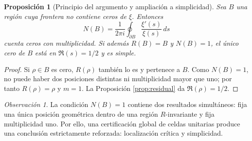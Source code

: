 \documentclass[11pt]{amsart}
\newtheorem{proposition}[theorem]{Proposición}
\theoremstyle{definition}
\theoremstyle{remark}
\newtheorem{remark}[theorem]{Observación}
\begin{document}
\begin{proposition}[Principio del argumento y ampliación a simplicidad]
Sea $B$ una región cuya frontera no contiene ceros de $\xi$. Entonces
\begin{equation}
 N(B)=\frac{1}{2\pi i}\oint_{\partial B}\frac{\xi'(s)}{\xi(s)}\,ds
\end{equation}
cuenta ceros con multiplicidad. Si además $R(B)=B$ y $N(B)=1$, el único cero de $B$ está en $\Re(s)=1/2$ y es simple.
\end{proposition}

\begin{proof}
Si $\rho\in B$ es cero, $R(\rho)$ también lo es y pertenece a $B$. Como $N(B)=1$, no puede haber dos posiciones distintas ni multiplicidad mayor que uno; por tanto $R(\rho)=\rho$ y $m=1$. La Proposición \ref{prop:residual} da $\Re(\rho)=1/2$.
\end{proof}

\begin{remark}
La condición $N(B)=1$ contiene dos resultados simultáneos: fija una única posición geométrica dentro de una región $R$-invariante y fija multiplicidad uno. Por ello, una certificación global de celdas unitarias produce una conclusión estrictamente reforzada: localización crítica y simplicidad.
\end{remark}
\end{document}

